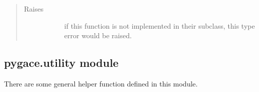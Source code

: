 \documentclass[letterpaper,10pt,english]{sphinxmanual}
\begin{document}
\begin{fulllineitems}
\begin{fulllineitems}
\begin{quote}
\begin{description}
\item[{Raises}] \leavevmode\begin{description}
\item[{}] \leavevmode
if this function is not implemented in their subclass, this type
error would be raised.

\end{description}

\end{description}\end{quote}

\end{fulllineitems}


\end{fulllineitems}



\subsection{pygace.utility module}
\label{\detokenize{pygace:module-pygace.utility}}\label{\detokenize{pygace:pygace-utility-module}}
There are some general helper function defined in this module.
\end{document}
